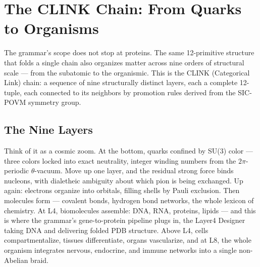 \documentclass[11pt,a4paper,twocolumn]{article}
\begin{document}
\section{The CLINK Chain: From Quarks to Organisms}

The grammar's scope does not stop at proteins. The same 12-primitive structure that folds a single chain also organizes matter across nine orders of structural scale — from the subatomic to the organismic. This is the CLINK (Categorical Link) chain: a sequence of nine structurally distinct layers, each a complete 12-tuple, each connected to its neighbors by promotion rules derived from the SIC-POVM symmetry group.

\subsection{The Nine Layers}

Think of it as a cosmic zoom. At the bottom, quarks confined by SU(3) color — three colors locked into exact neutrality, integer winding numbers from the $2\pi$-periodic $\theta$-vacuum. Move up one layer, and the residual strong force binds nucleons, with dialetheic ambiguity about which pion is being exchanged. Up again: electrons organize into orbitals, filling shells by Pauli exclusion. Then molecules form — covalent bonds, hydrogen bond networks, the whole lexicon of chemistry. At L4, biomolecules assemble: DNA, RNA, proteins, lipids — and this is where the grammar's gene-to-protein pipeline plugs in, the Layer4 Designer taking DNA and delivering folded PDB structure. Above L4, cells compartmentalize, tissues differentiate, organs vascularize, and at L8, the whole organism integrates nervous, endocrine, and immune networks into a single non-Abelian braid.
\end{document}
